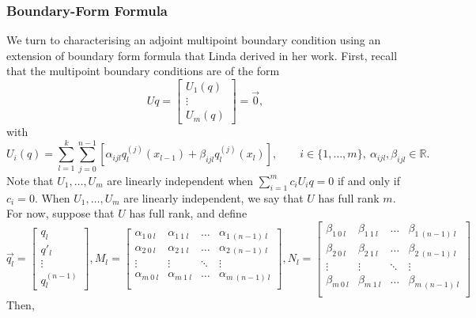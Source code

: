 \documentclass[11pt,reqno,oneside,a4paper]{article}
\theoremstyle{plain} %
\theoremstyle{definition}
\theoremstyle{remark}
\begin{document}
\subsubsection*{Boundary-Form Formula}
We turn to characterising an adjoint multipoint boundary condition using an extension of boundary form formula that Linda derived in her work.
First, recall that the multipoint boundary conditions are of the form
\[ 
Uq = \begin{bmatrix} U_1(q) \\ \vdots \\U_m(q) \end{bmatrix} = \vec{0},
\]
with 
\[ 
U_i(q) = \sum^{k}_{l=1} \sum^{n-1}_{j=0}[\alpha_{ijl} q_l^{(j)}(x_{l-1}) + \beta_{ijl} q_l^{(j)}(x_{l})], \qquad i \in \{ 1, \ldots, m \}, ~ \alpha_{ijl}, \beta_{ijl} \in \mathbb{R}.
\]
Note that $U_1, \ldots, U_m$ are linearly independent when $\sum^m_{i=1} c_i U_i q = 0$ if and only if $c_i = 0.$ When $U_1, \ldots, U_m$ are linearly independent, we say that $U$ has full rank $m.$ For now, suppose that $U$ has full rank, and define 
\begin{equation*}
\vec{q_l} = 
\begin{bmatrix}
q_l \\
q'_l \\
\vdots \\
 q_l^{(n-1)} 
\end{bmatrix}, M_l = 
\begin{bmatrix}
\alpha_{1~0~l} & \alpha_{1~1~l} & \ldots & \alpha_{1~(n-1)~l} \\
\alpha_{2~0~l} & \alpha_{2~1~l} & \ldots & \alpha_{2~(n-1)~l} \\
\vdots & \vdots & \ddots & \vdots \\
\alpha_{m~0~l} & \alpha_{m~1~l} & \ldots & \alpha_{m~(n-1)~l} \\
\end{bmatrix}, 
N_l = 
\begin{bmatrix}
\beta_{1~0~l} & \beta_{1~1~l} & \ldots & \beta_{1~(n-1)~l} \\
\beta_{2~0~l} & \beta_{2~1~l} & \ldots & \beta_{2~(n-1)~l} \\
\vdots & \vdots & \ddots & \vdots \\
\beta_{m~0~l} & \beta_{m~1~l} & \ldots & \beta_{m~(n-1)~l} \\
\end{bmatrix}
\end{equation*}
Then, 
\end{document}
